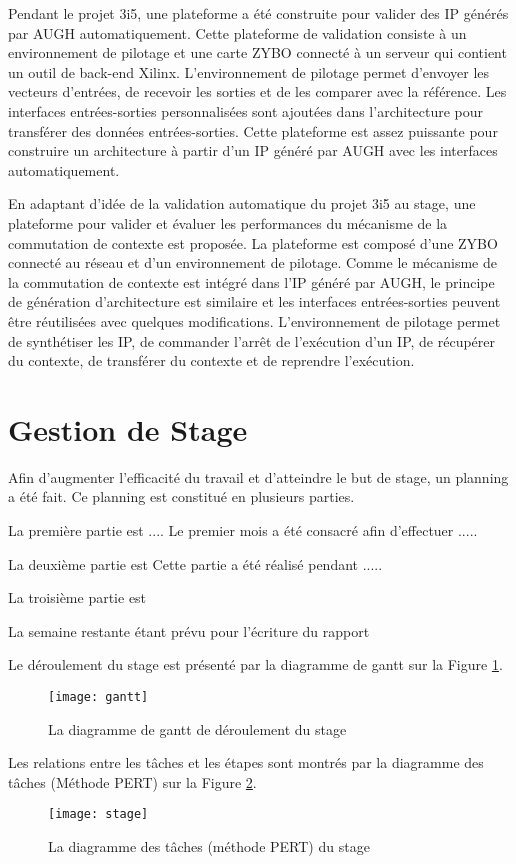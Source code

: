 Pendant le projet 3i5, une plateforme a été construite pour valider des IP générés par AUGH automatiquement\cite{Brisebard2015}.
Cette plateforme de validation consiste à un environnement de pilotage et une carte ZYBO\cite{zyboweb}
connecté à un serveur qui contient un outil de back-end Xilinx. L'environnement de pilotage permet d'envoyer les
vecteurs d'entrées, de recevoir les sorties et de les comparer avec la référence.
Les interfaces entrées-sorties personnalisées sont ajoutées dans l'architecture pour transférer des données entrées-sorties.
Cette plateforme est assez puissante pour construire un architecture à partir d'un IP généré par AUGH
avec les interfaces automatiquement.

En adaptant d'idée de la validation automatique du projet 3i5 au stage, une plateforme pour valider et évaluer les performances du mécanisme
de la commutation de contexte est proposée. La plateforme est composé d'une ZYBO connecté au réseau et d'un environnement de pilotage.
Comme le mécanisme de la commutation de contexte est intégré dans l'IP généré par AUGH,
le principe de génération d'architecture est similaire et les interfaces entrées-sorties peuvent être réutilisées avec quelques 
modifications. L'environnement de pilotage permet de
synthétiser les IP, de commander l'arrêt de l'exécution d'un IP, de récupérer du contexte, de transférer du contexte et
de reprendre l'exécution.

\section{Gestion de Stage}
\label{sec:gestion}

Afin d'augmenter l'efficacité du travail et d'atteindre le but de stage, un planning a été fait.
Ce planning est constitué en plusieurs parties.

La première partie est ....
Le premier mois a été consacré afin d'effectuer .....

La deuxième partie est 
Cette partie a été réalisé pendant .....

La troisième partie est

La semaine restante étant prévu pour l'écriture du rapport

Le déroulement du stage est présenté par la diagramme de gantt sur la Figure \ref{fig:ganttchart}.

\begin{figure}[h]
	\label{fig:ganttchart}
	\centering
	\texttt{[image: gantt]}
	\caption{La diagramme de gantt de déroulement du stage}
	\vspace{-2mm}
\end{figure}

Les relations entre les tâches et les étapes sont montrés par la diagramme des tâches (Méthode PERT) sur la Figure \ref{fig:pert}.

\begin{figure}[h]
	\label{fig:pert}
	\centering
	\texttt{[image: stage]}
	\caption{La diagramme des tâches (méthode PERT) du stage}
	\vspace{-2mm}
\end{figure}

